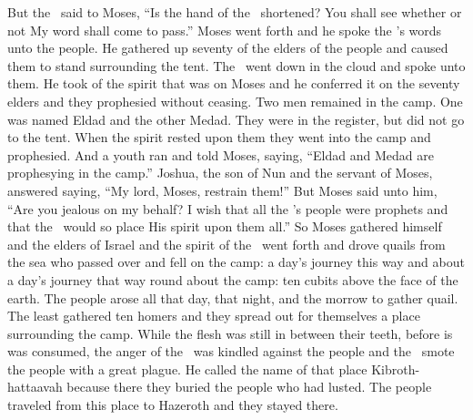 \begin{inparaenum}
   But the \lord\ said to Moses, ``Is the hand of the \lord\ shortened? You shall see whether or not My word shall come to pass.''%
   Moses went forth and he spoke the \lord's words unto the people. He gathered up seventy of the elders of the people and caused them to stand surrounding the tent.%
   The \lord\ went down in the cloud and spoke unto them. He took of the spirit that was on Moses and he conferred it on the seventy elders and they prophesied without ceasing.%
   Two men remained in the camp. One was named Eldad and the other Medad. They were in the register, but did not go to the tent. When the spirit rested upon them they went into the camp and prophesied.%
   And a youth ran and told Moses, saying, ``Eldad and Medad are prophesying in the camp.''%
   Joshua, the son of Nun and the servant of Moses, answered saying, ``My lord, Moses, restrain them!''%
   But Moses said unto him, ``Are you jealous on my behalf? I wish that all the \lord's people were prophets and that the \lord\ would so place His spirit upon them all.''%
   So Moses gathered himself and the elders of Israel%
   and the spirit of the \lord\ went forth and drove quails from the sea who passed over and fell on the camp: a day's journey this way and about a day's journey that way round about the camp: ten cubits above the face of the earth.%
   The people arose all that day, that night, and the morrow to gather quail. The least gathered ten homers and they spread out for themselves a place surrounding the camp.%
   While the flesh was still in between their teeth, before is was consumed, the anger of the \lord\ was kindled against the people and the \lord\ smote the people with a great plague.%
   He called the name of that place Kibroth-hattaavah because there they buried the people who had lusted.%
   The people traveled from this place to Hazeroth and they stayed there.%
\end{inparaenum}
